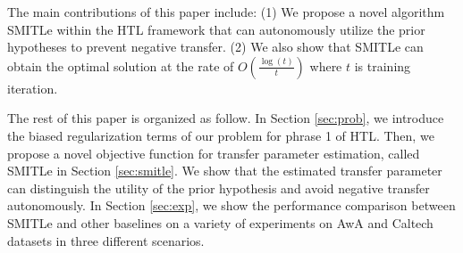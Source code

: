 The main contributions of this paper include: (1) We propose a novel algorithm SMITLe within the HTL framework that can autonomously utilize the prior hypotheses to prevent negative transfer. (2) We also show that SMITLe can obtain the optimal solution at the rate of $O(\frac{\log(t)}{t})$ where $t$ is training iteration.

The rest of this paper is organized as follow.
In Section \ref{sec:prob}, we introduce the biased regularization terms of our problem for phrase 1 of HTL. Then, we propose a novel objective function for transfer parameter estimation, called SMITLe in Section \ref{sec:smitle}. We show that the estimated transfer parameter can distinguish the utility of the prior hypothesis and avoid negative transfer autonomously. In Section \ref{sec:exp}, we show the performance comparison between SMITLe and other baselines on a variety of experiments on AwA and Caltech datasets in three different scenarios.

